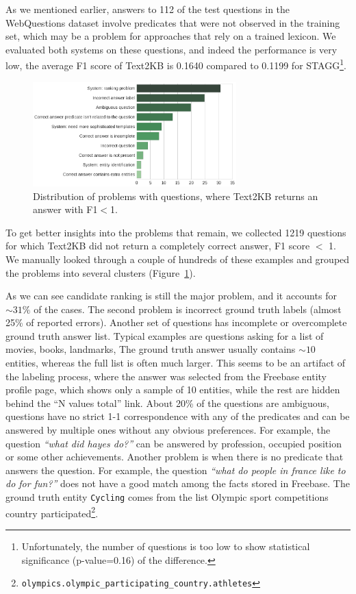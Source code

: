 As we mentioned earlier, answers to 112 of the test questions in the WebQuestions dataset involve predicates that were not observed in the training set, which may be a problem for approaches that rely on a trained lexicon.
We evaluated both systems on these questions, and indeed the performance is very low, \ie the average F1 score of Text2KB is 0.1640 compared to 0.1199 for STAGG\footnote{Unfortunately, the number of questions is too low to show statistical significance (p-value=0.16) of the difference.}.

\begin{figure}
\centering
\includegraphics[width=0.7\textwidth]{img/error_analysis}
\caption{Distribution of problems with questions, where Text2KB returns an answer with F1$<$1.}
\label{figure:factoid:text2kb:error_analysis}
\end{figure}

To get better insights into the problems that remain, we collected 1219 questions for which Text2KB did not return a completely correct answer, \ie F1 score $<$ 1.
We manually looked through a couple of hundreds of these examples and grouped the problems into several clusters (Figure~\ref{figure:factoid:text2kb:error_analysis}).

As we can see candidate ranking is still the major problem, and it accounts for $\sim31\%$ of the cases.
The second problem is incorrect ground truth labels (almost 25\% of reported errors).
Another set of questions has incomplete or overcomplete ground truth answer list.
Typical examples are questions asking for a list of movies, books, landmarks, \etc
The ground truth answer usually contains $\sim10$ entities, whereas the full list is often much larger.
This seems to be an artifact of the labeling process, where the answer was selected from the Freebase entity profile page, which shows only a sample of 10 entities, while the rest are hidden behind the ``N values total'' link.
About 20\% of the questions are ambiguous, \ie questions have no strict 1-1 correspondence with any of the predicates and can be answered by multiple ones without any obvious preferences.
For example, the question \textit{``what did hayes do?''} can be answered by profession, occupied position or some other achievements.
Another problem is when there is no predicate that answers the question.
For example, the question \textit{``what do people in france like to do for fun?''} does not have a good match among the facts stored in Freebase.
The ground truth entity \texttt{Cycling} comes from the list Olympic sport competitions country participated\footnote{\texttt{olympics.olympic\_participating\_country.athletes}}.

